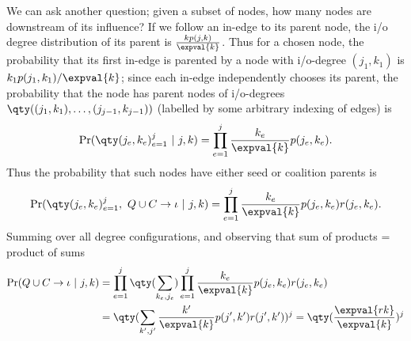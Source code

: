 We can ask another question; given a subset of nodes, how many nodes are downstream of its influence? If we follow an in-edge to its parent node, the i/o degree distribution of its parent is $\frac{k p(j,k)}{\expval{k}}$. Thus for a chosen node, the probability that its first in-edge is parented by a node with i/o-degree $(j_1, k_1)$ is $k_1p(j_1, k_1)/\expval{k}$; since each in-edge independently chooses its parent, the probability that the node has parent nodes of i/o-degrees $\qty((j_1, k_1), \ldots, (j_{j-1}, k_{j-1}))$ (labelled by some arbitrary indexing of edges) is
\begin{equation}
\Pr(\qty(j_e, k_e)_{e=1}^{j} \ \lvert \ j,k) = \prod_{e=1}^j\frac{k_e}{\expval{k}} p(j_e, k_e).
\end{equation}
Thus the probability that such nodes have either seed or coalition parents is
\begin{equation}
\Pr(\qty(j_e, k_e)_{e=1}^{j},\ Q\cup C \to \iota \ \lvert \ j,k) = \prod_{e=1}^j\frac{k_e}{\expval{k}} p(j_e, k_e)r(j_e, k_e).
\end{equation}
Summing over all degree configurations, and observing that sum of products = product of sums
\begin{align}
\Pr(Q\cup C \to \iota \ \lvert \ j,k) &= \prod_{e=1}^j\qty(\sum_{k_e,j_e})\prod_{e=1}^j\frac{k_e}{\expval{k}} p(j_e, k_e)r(j_e, k_e) \\
&= \qty(\sum_{k',j'}\frac{k'}{\expval{k}} p(j', k')r(j', k'))^j = \qty(\frac{\expval{rk}}{\expval{k}})^j
\end{align}

